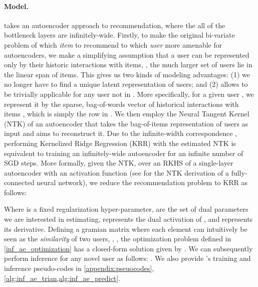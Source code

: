 \documentclass{article}
\begin{document}
\paragraph{Model.} \model takes an autoencoder approach to recommendation, where the all of the bottleneck layers are infinitely-wide. Firstly, to make the original bi-variate problem of which \emph{item} to recommend to which \emph{user} more amenable for autoencoders, we make a simplifying assumption that a user can be represented only by their historic interactions with items, \ie, the much larger set of users lie in the linear span of items. This gives us two kinds of modeling advantages: (1) we no longer have to find a unique latent representation of users; and (2) allows \model to be trivially applicable for any user not in . More specifically, for a given user , we represent it by the sparse, bag-of-words vector of historical interactions with items , which is simply the  row in . We then employ the Neural Tangent Kernel (NTK) \cite{ntk} of an autoencoder that takes the bag-of-items representation of users as input and aims to reconstruct it. Due to the infinite-width correspondence \cite{ntk, finite_vs_infinite_3}, performing Kernelized Ridge Regression (KRR) with the estimated NTK is equivalent to training an infinitely-wide autoencoder for an infinite number of SGD steps.
More formally, given the NTK,  over an RKHS  of a single-layer autoencoder with an activation function  (see \cite{ntk_class_notes} for the NTK derivation of a fully-connected neural network), we reduce the recommendation problem to KRR as follows:



Where  is a fixed regularization hyper-parameter,  are the set of dual parameters we are interested in estimating,  represents the dual activation of  \cite{dual_activation}, and  represents its derivative. Defining a gramian matrix  where each element can intuitively be seen as the \emph{similarity} of two users, \ie, , the optimization problem defined in \cref{inf_ae_optimization} has a closed-form solution given by . We can subsequently perform inference for any novel user as follows: . We also provide \model's training and inference pseudo-codes in \cref{appendix:pseuocodes}, \cref{alg:inf_ae_trian,alg:inf_ae_predict}.
\end{document}
